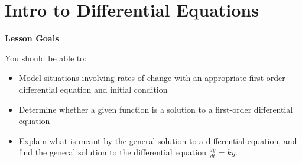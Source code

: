 \documentclass[main]{subfiles}
\begin{document}
\ifSubfilesClassLoaded{%
  \chaptermark{\chapterthree}
}{}

\section{Intro to Differential Equations} \label{ws3-1}

\begin{framed}
\centerline{\textbf{Lesson Goals}}

You should be able to:
\begin{itemize}
\item Model situations involving rates of change with an appropriate first-order differential equation and initial condition
\item Determine whether a given function is a solution to a first-order differential equation
\item Explain what is meant by the general solution to a differential equation, and find the general solution to the differential equation $\frac{dy}{dt}=ky$.
\end{itemize}
\end{framed}
\end{document}
